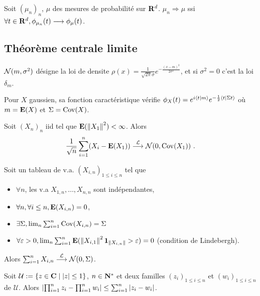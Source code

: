 	\begin{thm}[de Lévy]
		Soit $(\mu_n)_n$, $\mu$ des mesures de probabilité sur $\mathbf{R}^d$.
		$\mu_n \Rightarrow \mu$ ssi $\forall t \in \mathbf{R}^d, \phi_{\mu_n}(t) \longrightarrow \phi_\mu(t)$.
	\end{thm}


\subsection{Théorème centrale limite}

	\begin{note}
		$\mathcal{N}(m,\sigma^2)$ désigne la loi de densite $\rho(x) = \frac{1}{\sqrt{2\pi} \sigma} e^{-\frac{(x - m)^2}{2 \sigma^2}}$, et si $\sigma^2 = 0$ c'est la loi $\delta_m$.
	\end{note}

	Pour $X$ gaussien, sa fonction caractéristique vérifie $\phi_X(t) = e^{i\left\langle t \mid m \right\rangle} e^{-\frac{1}{2} \left\langle t \mid \Sigma t \right\rangle}$ où $m = \mathbf{E}(X)$ et $\Sigma = \operatorname{Cov}(X)$.
	
	\begin{thm}
		Soit $(X_n)_n$ iid tel que $\mathbf{E}(\left\lVert X_1\right\rVert^2) < \infty$.
		Alors
		$$\frac{1}{\sqrt{n}} \sum_{i = 1}^n (X_i - \mathbf{E}(X_1)) \overset{\mathcal{L}}{\longrightarrow} \mathcal{N}(0,\operatorname{Cov}(X_1))\ .$$
	\end{thm}

	\begin{thm}[de Linderbergh]
		Soit un tableau de v.a. $(X_{i,n})_{1 \leq i \leq n}$ tel que
		\begin{itemize}
			\item[\textbullet] $\forall n$, les v.a $X_{1,n},\ldots,X_{n,n}$ sont indépendantes,
			\item[\textbullet] $\forall n, \forall i \leq n, \mathbf{E}(X_{i,n}) = 0$,
			\item[\textbullet] $\exists \Sigma, \lim_n \sum_{i = 1}^n \operatorname{Cov}(X_{i,n}) = \Sigma$
			\item[\textbullet] $\forall \varepsilon > 0, \lim_n \sum_{i = 1}^n \mathbf{E}(\left\lVert X_{i,1}\right\rVert^2 \operatorname{\mathbf{1}}_{\left\lVert X_{i,n}\right\rVert} > \varepsilon) = 0$ (condition de Lindebergh).
		\end{itemize}
		Alors $\sum_{i = 1}^n X_{i,n} \overset{\mathcal{L}}{\longrightarrow} \mathcal{N}(0,\Sigma)$.
	\end{thm}
 
	\begin{lem}
		Soit $\mathcal{U} := \{ z \in \mathbf{C} \mid \left\lvert z\right\rvert \leq 1 \}$, $n \in \mathbf{N}^*$ et deux familles $(z_i)_{1 \leq i \leq n}$ et $(w_i)_{1 \leq i \leq n}$ de $\mathcal{U}$.
		Alors $\left\lvert \prod_{i = 1}^n z_i - \prod_{i = 1}^n w_i \right\rvert \leq \sum_{i = 1}^n \left\lvert z_i - w_i\right\rvert$.
	\end{lem}
